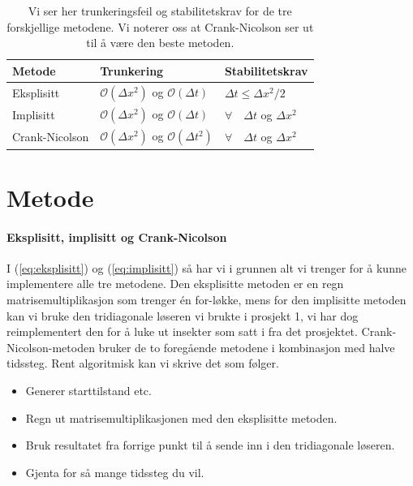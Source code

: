 \documentclass[norsk, 10pt]{article}
\begin{document}
\begin{table}[H]
  \centering
  \begin{tabular}{ l l l }
    \toprule
    Metode & Trunkering & Stabilitetskrav \\
    \midrule
	Eksplisitt & $\mathcal{O}(\Delta x^2)$ og $\mathcal{O}(\Delta t)$ & $\Delta t \leq \Delta x^2/2$ \\
	Implisitt & $\mathcal{O}(\Delta x^2)$ og $\mathcal{O}(\Delta t)$ & $\forall \quad\Delta t$ og $\Delta x^2$ \\
	Crank-Nicolson & $\mathcal{O}(\Delta x^2)$ og $\mathcal{O}(\Delta t^2)$ & $\forall \quad\Delta t$ og $\Delta x^2$ \\
    \bottomrule
  \end{tabular}
  \caption{Vi ser her trunkeringsfeil og stabilitetskrav for de tre forskjellige metodene. Vi noterer oss at Crank-Nicolson ser ut til å være den beste metoden.}
  \label{tab:trunkering}
\end{table}


\section*{Metode}
\paragraph{Eksplisitt, implisitt og Crank-Nicolson}
I (\ref{eq:eksplisitt}) og (\ref{eq:implisitt}) så har vi i grunnen alt vi trenger for å kunne implementere alle tre metodene. Den eksplisitte metoden er en regn matrisemultiplikasjon som trenger én for-løkke, mens for den implisitte metoden kan vi bruke den tridiagonale løseren vi brukte i prosjekt 1, vi har dog reimplementert den for å luke ut insekter som satt i fra det prosjektet. Crank-Nicolson-metoden bruker de to foregående metodene i kombinasjon med halve tidssteg. Rent algoritmisk kan vi skrive det som følger.
\begin{itemize}
\item
Generer starttilstand etc.
\item
Regn ut matrisemultiplikasjonen med den eksplisitte metoden.
\item
Bruk resultatet fra forrige punkt til å sende inn i den tridiagonale løseren.
\item
Gjenta for så mange tidssteg du vil.
\end{itemize}
\end{document}
